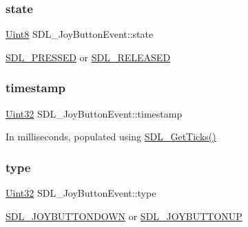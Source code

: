 \subsubsection{\texorpdfstring{state}{state}}
{\footnotesize\ttfamily \hyperlink{_s_d_l__stdinc_8h_a2944638813a090aa23e62f4da842c3e2}{Uint8} S\+D\+L\+\_\+\+Joy\+Button\+Event\+::state}

\hyperlink{_s_d_l__events_8h_aee81bbffbc8489bdea8fecd1232c4bd1}{S\+D\+L\+\_\+\+P\+R\+E\+S\+S\+ED} or \hyperlink{_s_d_l__events_8h_ad680a069f9fcab80de91b3eefdf29c3c}{S\+D\+L\+\_\+\+R\+E\+L\+E\+A\+S\+ED} \mbox{\label{struct_s_d_l___joy_button_event_ab50b6f7d1ab3ac53df69fc2d6cf5fa2a}} 
\subsubsection{\texorpdfstring{timestamp}{timestamp}}
{\footnotesize\ttfamily \hyperlink{_s_d_l__stdinc_8h_add440eff171ea5f55cb00c4a9ab8672d}{Uint32} S\+D\+L\+\_\+\+Joy\+Button\+Event\+::timestamp}

In milliseconds, populated using \hyperlink{_s_d_l__timer_8h_a0b9bc71d6287e0ffafdc3419760fe2b3}{S\+D\+L\+\_\+\+Get\+Ticks()} \mbox{\label{struct_s_d_l___joy_button_event_a8f3312a046d37fa2884b93f69c4cb655}} 
\subsubsection{\texorpdfstring{type}{type}}
{\footnotesize\ttfamily \hyperlink{_s_d_l__stdinc_8h_add440eff171ea5f55cb00c4a9ab8672d}{Uint32} S\+D\+L\+\_\+\+Joy\+Button\+Event\+::type}

\hyperlink{_s_d_l__events_8h_a3b589e89be6b35c02e0dd34a55f3fccaa386ac978bc145a45883fe0adab70710b}{S\+D\+L\+\_\+\+J\+O\+Y\+B\+U\+T\+T\+O\+N\+D\+O\+WN} or \hyperlink{_s_d_l__events_8h_a3b589e89be6b35c02e0dd34a55f3fccaa76f91c81110f012e3a47cbbc0449e3c3}{S\+D\+L\+\_\+\+J\+O\+Y\+B\+U\+T\+T\+O\+N\+UP} \mbox{\label{struct_s_d_l___joy_button_event_a1679049adad7242b28420948fdc79044}} 
